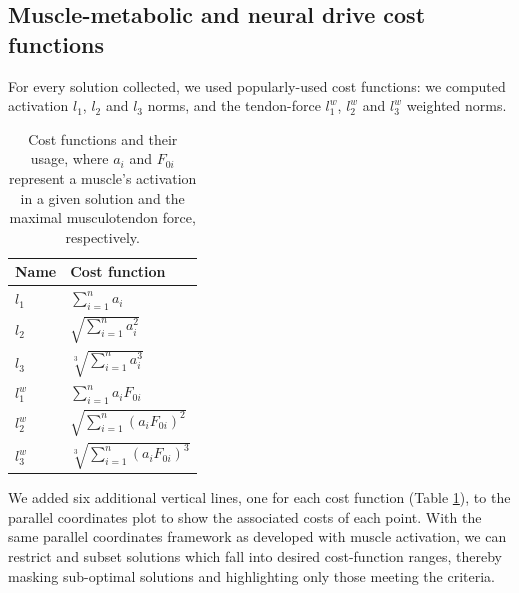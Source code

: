 \subsection{Muscle-metabolic and neural drive cost functions}

For every solution collected, we used popularly-used cost functions: we computed activation $l_1$, $l_2$ and $l_3$ norms, and the tendon-force $l_1^w$, $l_2^w$ and $l_3^w$ weighted norms.


\begin{table}[h]
\centering
\begin{tabular}{@{}ll@{}}
\toprule
\textbf{Name} & \textbf{Cost function}  \\ \midrule
$l_1$            & $\sum_{i=1}^n a_i$                                     \\
$l_2$            & $\sqrt{\sum_{i=1}^n a_i^2}$                                    \\
$l_3$            & $\sqrt[3]{\sum_{i=1}^n a_i^3}$                                   \\
$l_1^w$            & $\sum_{i=1}^n a_i F_{0i}$                                    \\
$l_2^w$            & $\sqrt{\sum_{i=1}^n (a_i F_{0i})^2}$                                  \\
$l_3^w$            & $\sqrt[3]{\sum_{i=1}^n (a_i F_{0i})^3}$                                    \\ \bottomrule
\end{tabular}
\caption{Cost functions and their usage, where $a_i$ and $F_{0i}$ represent a muscle's activation in a given solution and the maximal musculotendon force, respectively.}
\label{cost_function_tabls}
\end{table}

We added six additional vertical lines, one for each cost function (Table \ref{cost_function_tabls}), to the parallel coordinates plot to show the associated costs of each point. With the same parallel coordinates framework as developed with muscle activation, we can restrict and subset solutions which fall into desired cost-function ranges, thereby masking sub-optimal solutions and highlighting only those meeting the criteria.
